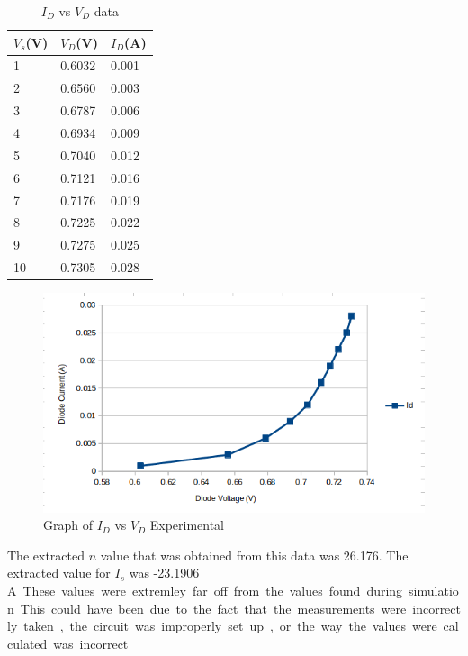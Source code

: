 \documentclass[11pt]{article}
\begin{document}
	\begin{table}[H]
		\centering
		\caption{\(I_D\) vs \(V_D\) data}
		\label{table:id_vd}
		\begin{tabular}{|l|l|l|}
			\hline
			\(V_s\)(V) & \(V_D\)(V) & \(I_D\)(A)\\
			\hline
			1 & 0.6032 & 0.001\\
			2 & 0.6560 & 0.003\\
			3 & 0.6787 & 0.006\\
			4 & 0.6934 & 0.009\\
			5 & 0.7040 & 0.012\\
			6 & 0.7121 & 0.016\\
			7 & 0.7176 & 0.019\\
			8 & 0.7225 & 0.022\\
			9 & 0.7275 & 0.025\\
			10 & 0.7305 & 0.028\\
			\hline
		\end{tabular}
	\end{table}

	\begin{figure}[H]
		\centering
		\includegraphics[width=\textwidth]{diode_Id_Vd_experimental.png}
		\caption{Graph of \(I_D\) vs \(V_D\) Experimental}
		\label{fig:id_vd_graph_exp}
	\end{figure}
	
	The extracted \(n\) value that was obtained from this data was 26.176. The 
	extracted value for \(I_s\) was -23.1906 \si\ampere. These values were extremley
	far off from the values found during simulation. This could have been due to 
	the fact that the measurements were incorrectly taken, the circuit was improperly
	set up, or the way the values were calculated was incorrect.\\
	
\end{document}
